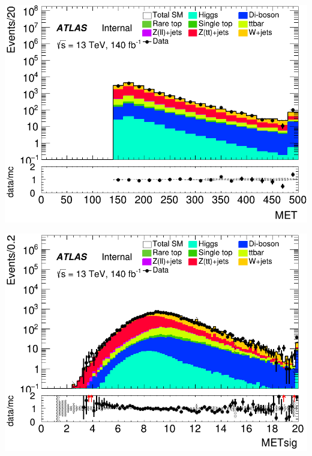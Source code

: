 \documentclass[usenames,dvipsnames]{beamer}
\begin{document}
\begin{frame}
    \vspace{0.5cm} %

    \begin{minipage}{0.32\textwidth}
        \centering
        \includegraphics[width=\textwidth]{graphics/HH_met/HH_met_MET.png}
    \end{minipage}
    \hfill
    \begin{minipage}{0.32\textwidth}
        \centering
        \includegraphics[width=\textwidth]{graphics/HH_met/HH_met_METsig.png}
    \end{minipage}
    \hfill
    

\end{frame}
\end{document}
